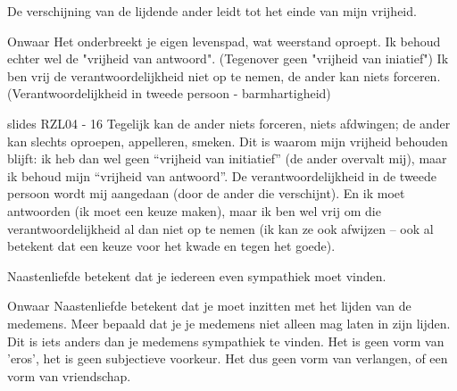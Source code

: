 \documentclass[main.tex]{subfiles}
\begin{document}
\begin{examenvraag}
    \begin{stelling}
        De verschijning van de lijdende ander leidt tot het einde van mijn vrijheid.
    \end{stelling}

	 \begin{stelling-antwoord}{Onwaar}
		Het onderbreekt je eigen levenspad, wat weerstand oproept.
		Ik behoud echter wel de "vrijheid van antwoord". (Tegenover  geen "vrijheid van iniatief")
		Ik ben vrij de verantwoordelijkheid niet op te nemen, de ander kan niets forceren.
		(Verantwoordelijkheid in tweede persoon - barmhartigheid)
		
	 \begin{citaat}{slides RZL04 - 16}
Tegelijk kan de ander niets forceren, niets afdwingen; de ander kan slechts oproepen, appelleren, smeken.
Dit is waarom mijn vrijheid behouden blijft: ik heb dan wel geen “vrijheid van initiatief” (de ander overvalt mij), 
maar ik behoud mijn “vrijheid van antwoord”.
De verantwoordelijkheid in de tweede persoon wordt mij aangedaan (door de ander die verschijnt).
En ik moet antwoorden (ik moet een keuze maken), maar ik ben wel vrij om die verantwoordelijkheid al dan niet op te nemen (ik kan ze ook afwijzen – ook al betekent dat een keuze voor het kwade en tegen het goede).
        \end{citaat}
		
    \end{stelling-antwoord}
\end{examenvraag}


\begin{examenvraag}
    \begin{stelling}
        Naastenliefde betekent dat je iedereen even sympathiek moet vinden.
    \end{stelling}

    \begin{stelling-antwoord}{Onwaar}
        Naastenliefde betekent dat je moet inzitten met het lijden van de medemens.
        Meer bepaald dat je je medemens niet alleen mag laten in zijn lijden.
        Dit is iets anders dan je medemens sympathiek te vinden.
        Het is geen vorm van 'eros', het is geen subjectieve voorkeur.
        Het dus geen vorm van verlangen, of een vorm van vriendschap.
    \end{stelling-antwoord}
\end{examenvraag}
\end{document}

